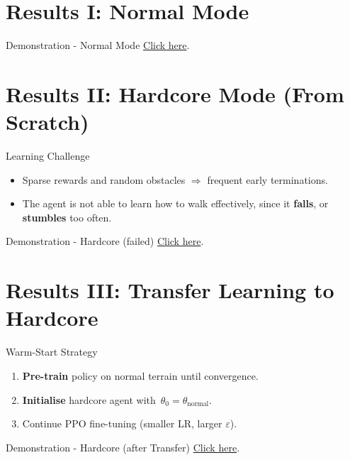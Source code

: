 \documentclass[10pt,aspectratio=169]{beamer}
\begin{document}
\section{Results I: Normal Mode}

\begin{frame}{Demonstration - Normal Mode}
\href{https://github.com/RushilGupta4/CS-5410/tree/main/Walker/gifs/normal_final.gif}{Click here}.
\end{frame}

\section{Results II: Hardcore Mode (From Scratch)}

\begin{frame}{Learning Challenge}
\begin{itemize}
  \item Sparse rewards and random obstacles $\Rightarrow$ frequent early terminations.
  \item The agent is not able to learn how to walk effectively, since it \textbf{falls}, or \textbf{stumbles} too often.
\end{itemize}
\end{frame}

\begin{frame}{Demonstration - Hardcore (failed)}
\href{https://github.com/RushilGupta4/CS-5410/tree/main/Walker/gifs/hardcore_fail.gif}{Click here}.
\end{frame}

\section{Results III: Transfer Learning to Hardcore}

\begin{frame}{Warm-Start Strategy}
\begin{enumerate}
  \item \textbf{Pre-train} policy on normal terrain until convergence.\\[1.75em]
  \item \textbf{Initialise} hardcore agent with \,$\theta_{0}=\theta_{\text{normal}}$.\\[1.75em]
  \item Continue PPO fine-tuning (smaller LR, larger $\varepsilon$).
\end{enumerate}
\end{frame}

\begin{frame}{Demonstration - Hardcore (after Transfer)}
\href{https://github.com/RushilGupta4/CS-5410/tree/main/Walker/gifs/hardcore_final.gif}{Click here}.
\end{frame}

\end{document}
